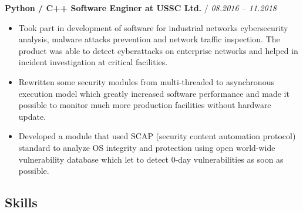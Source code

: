 \documentclass[a4paper,10pt]{article}
\newcommand{\notice}[1]{{\textcolor{dark}{\textbf{#1}}}}
\begin{document}
\begin{adjustwidth}{10pt}{10pt}
\begin{itemize}
        \end{itemize}


        \notice{Python / C++ Software Enginer at USSC Ltd.} / \textit{08.2016 – 11.2018}

        \begin{itemize}

        \item Took part in development of software for industrial networks cybersecurity analysis, malware attacks prevention and network traffic inspection. The product was able to detect cyberattacks on enterprise networks and helped in incident investigation at critical facilities.

        \item Rewritten some security modules from multi-threaded to asynchronous execution model which greatly increased software performance and made it possible to monitor much more production facilities without hardware update.

        \item Developed a module that used SCAP (security content automation protocol) standard to analyze OS integrity and protection using open world-wide vulnerability database which let to detect 0-day vulnerabilities as soon as possible.

        \end{itemize}

    \end{adjustwidth}

\subsection*{Skills}
\end{document}
